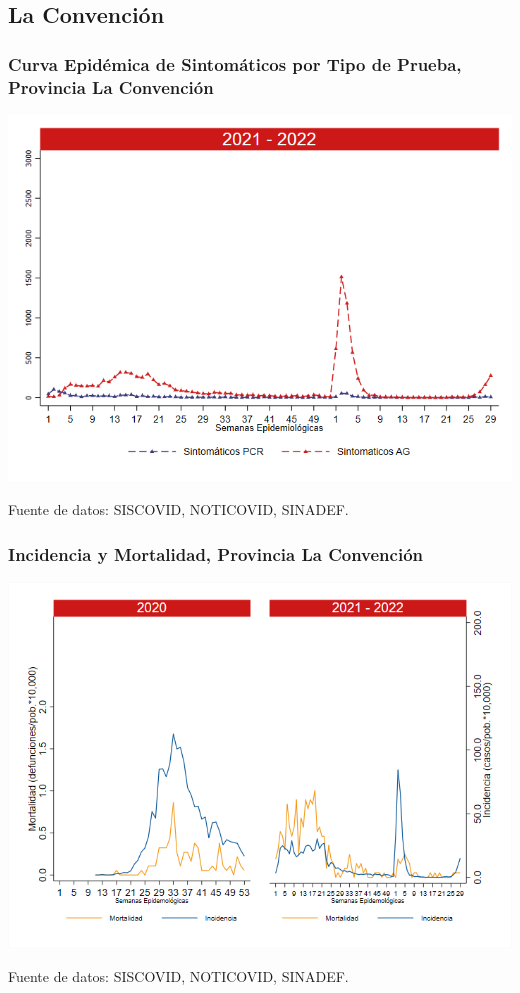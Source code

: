 \documentclass[xcolor=table]{beamer}
\begin{document}
\subsection{La Convención}
\begin{frame}[label=laconvecion]
	\frametitle{Curva Epidémica de Sintomáticos por Tipo de Prueba, Provincia La Convención}
	\vspace{-.5cm}
	\begin{center}
		\includegraphics[width=0.8\linewidth, trim={0cm .5cm 0cm 0.2cm},clip]{../figuras/sinto_prueba20_21_9.png}
	\end{center}
	{\tiny Fuente de datos: SISCOVID, NOTICOVID, SINADEF.}
	\hyperlink{TipoPrueba}{}
\end{frame}
\begin{frame}[label=laconvencion]
	\frametitle{Incidencia y Mortalidad, Provincia La Convención}
	\vspace{-.5cm}
	\begin{center}
		\includegraphics[width=0.8\linewidth, trim={0cm .5cm 0cm 0.2cm},clip]{../figuras/incidencia_mortalidad_20_21_9.png}
	\end{center}
	{\tiny Fuente de datos: SISCOVID, NOTICOVID, SINADEF.}
\end{frame}
\end{document}
